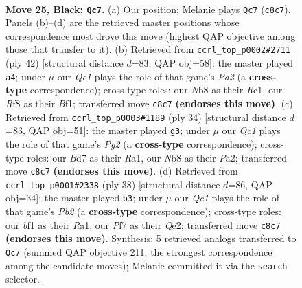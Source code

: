 \documentclass[11pt]{article}
\begin{document}
\clearpage

\begin{figure}[p]\centering
\begin{subfigure}{0.46\textwidth}\centering
\resizebox{\linewidth}{!}{%
\newchessgame
\chessboard[
  setfen={1nq2rk1/1r1b1ppp/8/4Pp2/p1p2P2/6K1/PPP3PP/1R2QBNR b - - 5 25},
  showmover=false,
  pgfstyle=straightmove, color=movearrow, markmove={c8-c7}
]}
\caption{}
\end{subfigure}\hfill
\begin{subfigure}{0.46\textwidth}\centering
\resizebox{\linewidth}{!}{%
\newchessgame
\chessboard[
  setfen={2rr2k1/p3q2p/1pbpp1p1/5n2/1PP5/2N2P2/P4QPP/2R1RBK1 w - - 0 22},
  showmover=false,
  pgfstyle=straightmove, color=movearrow, markmove={a2-a4}
]}
\caption{}
\end{subfigure}
\\[4pt]
\begin{subfigure}{0.46\textwidth}\centering
\resizebox{\linewidth}{!}{%
\newchessgame
\chessboard[
  setfen={r1r3k1/pp3p1p/1q1p1bp1/3P4/2Pp4/3B4/PPQ2PPP/R4RK1 w - - 0 18},
  showmover=false,
  pgfstyle=straightmove, color=movearrow, markmove={g2-g3}
]}
\caption{}
\end{subfigure}\hfill
\begin{subfigure}{0.46\textwidth}\centering
\resizebox{\linewidth}{!}{%
\newchessgame
\chessboard[
  setfen={1r2qr1k/3b1ppp/3p4/3Np1b1/pPB1P3/8/1P2QPPP/R4RK1 w - - 7 20},
  showmover=false,
  pgfstyle=straightmove, color=movearrow, markmove={b2-b3}
]}
\caption{}
\end{subfigure}
\caption{\textbf{Move 25, Black: \texttt{Qc7}.} (a) Our position; Melanie plays \texttt{Qc7} (\texttt{c8c7}). Panels (b)--(d) are the retrieved master positions whose correspondence most drove this move (highest QAP objective among those that transfer to it). (b) Retrieved from \texttt{ccrl\_top\_p0002\#2711} (ply 42) [structural distance $d$=83, QAP obj=58]: the master played \texttt{a4}; under $\mu$ our \emph{Qc1} plays the role of that game's \emph{Pa2} (a \textbf{cross-type} correspondence); cross-type roles: our \emph{N}b8 as their \emph{R}c1, our \emph{R}f8 as their \emph{B}f1; transferred move \texttt{c8c7} \textbf{(endorses this move)}. (c) Retrieved from \texttt{ccrl\_top\_p0003\#1189} (ply 34) [structural distance $d$=83, QAP obj=51]: the master played \texttt{g3}; under $\mu$ our \emph{Qc1} plays the role of that game's \emph{Pg2} (a \textbf{cross-type} correspondence); cross-type roles: our \emph{B}d7 as their \emph{R}a1, our \emph{N}b8 as their \emph{P}a2; transferred move \texttt{c8c7} \textbf{(endorses this move)}. (d) Retrieved from \texttt{ccrl\_top\_p0001\#2338} (ply 38) [structural distance $d$=86, QAP obj=34]: the master played \texttt{b3}; under $\mu$ our \emph{Qc1} plays the role of that game's \emph{Pb2} (a \textbf{cross-type} correspondence); cross-type roles: our \emph{b}f1 as their \emph{R}a1, our \emph{P}f7 as their \emph{Q}e2; transferred move \texttt{c8c7} \textbf{(endorses this move)}. Synthesis: 5 retrieved analogs transferred to \texttt{Qc7} (summed QAP objective 211, the strongest correspondence among the candidate moves); Melanie committed it via the \texttt{search} selector.}
\label{fig:thought-m49}
\end{figure}
\end{document}
